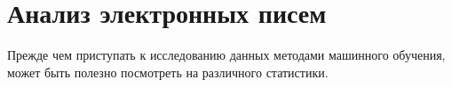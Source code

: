 \chapter{Анализ электронных писем}

Прежде чем приступать к исследованию данных методами машинного обучения, может быть полезно посмотреть на различного статистики.




\newpage
